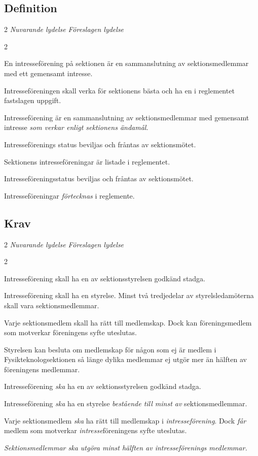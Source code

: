 \documentclass{article}
\newenvironment{lydelse}
    {\begin{paracol}{2}%
        \emph{Nuvarande lydelse}%
        \switchcolumn%
        \emph{Föreslagen lydelse}%
    \end{paracol}%
    \begin{enumerate}[label=\thesubsection.\arabic*]%
    \begin{paracol}{2}%
    }{\end{paracol}\end{enumerate}}
\begin{document}
\subsection{Definition}
\begin{lydelse}
  \setcounter{section}{12}
  \setcounter{subsection}{1}
  \item En intresseförening på sektionen är en sammanslutning av sektionsmedlemmar med ett gemensamt intresse.
  \item Intresseföreningen skall verka för sektionens bästa och ha en i reglementet fastslagen uppgift.
\switchcolumn
  \setcounter{section}{11}
  \item Intresseförening är en sammanslutning av sektionsmedlemmar med gemensamt intresse \emph{som verkar enligt sektionens ändamål}.
\switchcolumn*
  \setcounter{subsection}{3}
  \setcounter{enumi}{0}
  \item Intresseförenings status beviljas och fråntas av sektionsmötet.
  
  \setcounter{subsection}{8}
  \setcounter{enumi}{0}
  \item Sektionens intresseföreningar är listade i reglementet.
\switchcolumn
  \item Intresseföreningsstatus beviljas och fråntas av sektionsmötet.
  \item Intresseföreningar \emph{förtecknas} i reglemente.
\end{lydelse}
\setcounter{section}{11}
\setcounter{subsection}{1}

\subsection{Krav}
\begin{lydelse}
  \setcounter{section}{12}
  \setcounter{subsection}{2}
  \item Intresseförening skall ha en av sektionsstyrelsen godkänd stadga.
  \item Intresseförening skall ha en styrelse. Minst två tredjedelar av styrelsledamöterna skall vara sektionsmedlemmar.
  \setcounter{subsection}{7}
  \item Varje sektionsmedlem skall ha rätt till medlemskap. Dock kan föreningsmedlem som motverkar föreningens syfte uteslutas. 
  \item Styrelsen kan besluta om medlemskap för någon som ej är medlem i Fysikteknologsektionen så länge dylika medlemmar ej utgör mer än hälften av föreningens medlemmar.
  \switchcolumn
  \setcounter{section}{11}
  \item Intresseförening \emph{ska} ha en av sektionsstyrelsen godkänd stadga.
  \item Intresseförening \emph{ska} ha en styrelse \emph{bestående till minst  av} sektionsmedlemmar.
  \item Varje sektionsmedlem \emph{ska} ha rätt till medlemskap i \emph{intresseförening}.
    Dock \emph{får} medlem som motverkar \emph{intresse}föreningens syfte uteslutas. \label{11.x:intrrätt}
  \item \emph{Sektionsmedlemmar ska utgöra minst hälften av intresseförenings medlemmar.}
\end{lydelse}
\setcounter{section}{11}
\setcounter{subsection}{2}
\end{document}
